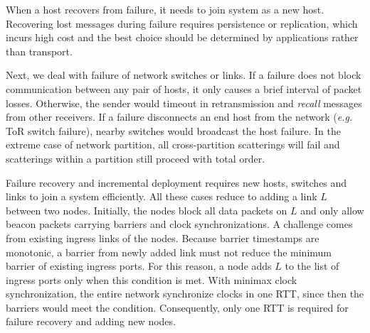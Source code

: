 When a host recovers from failure, it needs to join \sys system as a new host.
Recovering lost messages during failure requires persistence or replication, which incurs high cost and the best choice should be determined by applications rather than \sys transport.

Next, we deal with failure of network switches or links.
If a failure does not block communication between any pair of hosts, it only causes a brief interval of packet losses.
Otherwise, the sender would timeout in retransmission and \textit{recall} messages from other receivers.
If a failure disconnects an end host from the network (\textit{e.g.} ToR switch failure), nearby switches would broadcast the host failure.
In the extreme case of network partition, all cross-partition scatterings will fail and scatterings within a partition still proceed with total order.



Failure recovery and incremental deployment requires new hosts, switches and links to join a \sys system efficiently.
All these cases reduce to adding a link $L$ between two nodes.
Initially, the nodes block all data packets on $L$ and only allow beacon packets carrying barriers and clock synchronizations.
A challenge comes from existing ingress links of the nodes.
Because barrier timestamps are monotonic, a barrier from newly added link must not reduce the minimum barrier of existing ingress ports.
For this reason, a node adds $L$ to the list of ingress ports only when this condition is met.
With minimax clock synchronization, the entire network synchronize clocks in one RTT, since then the barriers would meet the condition.
Consequently, only one RTT is required for failure recovery and adding new nodes.

